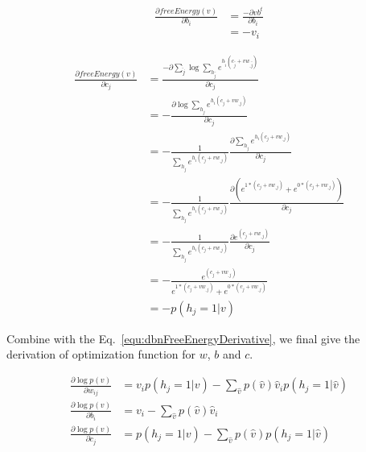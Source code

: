 \documentclass[runningheads,openany]{xhlPaper}
\begin{document}
\begin{equation}
\label{equ:dbn_rbm_free_energy_derivation_for_b}
\begin{aligned}
\frac{{\partial freeEnergy\left( v \right)}}{{\partial {b_i}}} &= \frac{{ - \partial v{b^t}}}{{\partial {b_i}}}\\
 &=  - {v_i}
\end{aligned}
\end{equation}

\begin{equation}
\label{equ:dbn_rbm_free_energy_derivation_for_c}
\begin{aligned}
\frac{{\partial freeEnergy\left( v \right)}}{{\partial {c_j}}} &= \frac{{ - \partial \sum\limits_{\hat j} {\log \sum\limits_{{h_{\hat j}}} {{e^{{h_{\hat i}}\left( {{c_{\hat j}} + v{w_{\_\hat j}}} \right)}}} } }}{{\partial {c_j}}}\\
 &=  - \frac{{\partial \log \sum\limits_{{h_j}} {{e^{{h_i}\left( {{c_j} + v{w_{\_j}}} \right)}}} }}{{\partial {c_j}}}\\
 &=  - \frac{1}{{\sum\limits_{{h_j}} {{e^{{h_i}\left( {{c_j} + v{w_{\_j}}} \right)}}} }}\frac{{\partial \sum\limits_{{h_j}} {{e^{{h_i}\left( {{c_j} + v{w_{\_j}}} \right)}}} }}{{\partial {c_j}}}\\
 &=  - \frac{1}{{\sum\limits_{{h_j}} {{e^{{h_i}\left( {{c_j} + v{w_{\_j}}} \right)}}} }}\frac{{\partial \left( {{e^{1*\left( {{c_j} + v{w_{\_j}}} \right)}} + {e^{0*\left( {{c_j} + v{w_{\_j}}} \right)}}} \right)}}{{\partial {c_j}}}\\
 &=  - \frac{1}{{\sum\limits_{{h_j}} {{e^{{h_i}\left( {{c_j} + v{w_{\_j}}} \right)}}} }}\frac{{\partial {e^{\left( {{c_j} + v{w_{\_j}}} \right)}}}}{{\partial {c_j}}}\\
 &=  - \frac{{{e^{\left( {{c_j} + v{w_{\_j}}} \right)}}}}{{{e^{1*\left( {{c_j} + v{w_{\_j}}} \right)}} + {e^{0*\left( {{c_j} + v{w_{\_j}}} \right)}}}}\\
 &=  - p\left( {{h_j} = 1|v} \right)
\end{aligned}
\end{equation}

Combine with the Eq.~\ref{equ:dbnFreeEnergyDerivative}, we final give the derivation of optimization function for $w$, $b$ and $c$.

\begin{equation}
\label{equ:dbn_rbm_object_derivation}
\begin{aligned}
\frac{{\partial \log p\left( v \right)}}{{\partial {w_{ij}}}} &= {v_i}p\left( {{h_j} = 1|v} \right) - \sum\limits_{\hat v} {p\left( {\hat v} \right){{\hat v}_i}p\left( {{h_j} = 1|\hat v} \right)} \\
\frac{{\partial \log p\left( v \right)}}{{\partial {b_i}}} &= {v_i} - \sum\limits_{\hat v} {p\left( {\hat v} \right){{\hat v}_i}} \\
\frac{{\partial \log p\left( v \right)}}{{\partial {c_j}}} &= p\left( {{h_j} = 1|v} \right) - \sum\limits_{\hat v} {p\left( {\hat v} \right)p\left( {{h_j} = 1|\hat v} \right)} 
\end{aligned}
\end{equation}
\end{document}

